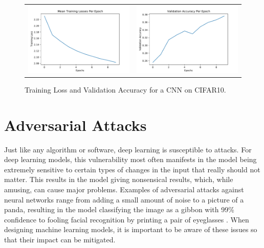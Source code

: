 \begin{figure}[H]
    \centering
    \begin{tabular}{cc}
    \includegraphics[width=.45\textwidth]{figures/training.pdf} &
    \includegraphics[width=.45\textwidth]{figures/validation.pdf}
    \end{tabular}
    \caption{Training Loss and Validation Accuracy for a CNN on CIFAR10.}
    \label{fig:results}
\end{figure}


\section*{Adversarial Attacks}
 
Just like any algorithm or software, deep learning is susceptible to attacks.
For deep learning models, this vulnerability most often manifests in the model being extremely sensitive to certain types of changes in the input that really should not matter.
This results in the model giving nonsensical results, which, while amusing, can cause major problems.
Examples of adversarial attacks against neural networks range from adding a small amount of noise to a picture of a panda, resulting in the model classifying the image as a gibbon with 99\% confidence \cite{goodfellow2015advesarial} to fooling facial recognition by printing a pair of eyeglasses \cite{goodfellow2017physical}.
When designing machine learning models, it is important to be aware of these issues so that their impact can be mitigated.

